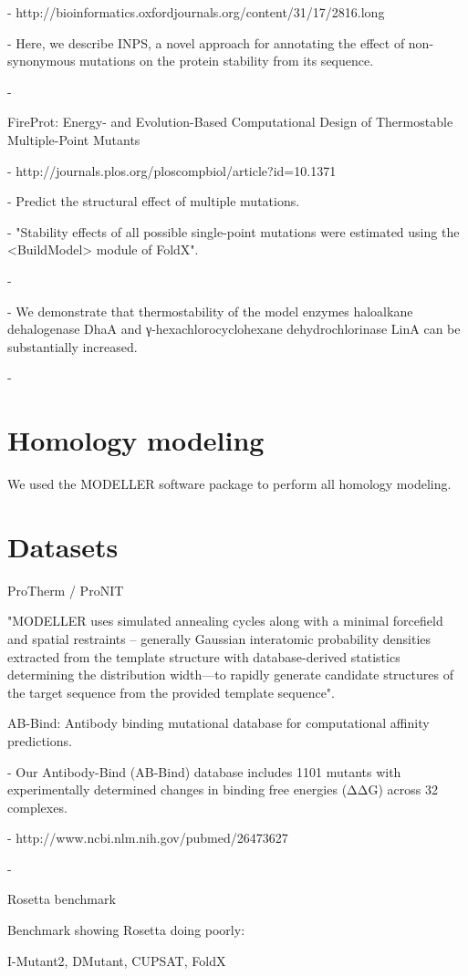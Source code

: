   - http://bioinformatics.oxfordjournals.org/content/31/17/2816.long

  - Here, we describe INPS, a novel approach for annotating the effect of non-synonymous mutations on the protein stability from its sequence.

  - \cite{fariselli_inps:_2015}


FireProt: Energy- and Evolution-Based Computational Design of Thermostable Multiple-Point Mutants

  - http://journals.plos.org/ploscompbiol/article?id=10.1371%

  - Predict the structural effect of multiple mutations.

  - "Stability effects of all possible single-point mutations were estimated using the <BuildModel> module of FoldX".

  -

  - We demonstrate that thermostability of the model enzymes haloalkane dehalogenase DhaA and γ-hexachlorocyclohexane dehydrochlorinase LinA can be substantially increased.

  - \cite{bednar_fireprot:_2015}




\section{Homology modeling}

We used the MODELLER software package to perform all homology modeling.







\section{Datasets}

ProTherm / ProNIT \cite{Zeng2011} \cite{kumar_protherm_2006}

"MODELLER uses simulated annealing cycles along with a minimal forcefield and spatial restraints -- generally Gaussian interatomic probability densities extracted from the template structure with database-derived statistics determining the distribution width—to rapidly generate candidate structures of the target sequence from the provided template sequence".


AB-Bind: Antibody binding mutational database for computational affinity predictions.

  - Our Antibody-Bind (AB-Bind) database includes 1101 mutants with experimentally determined changes in binding free energies (ΔΔG) across 32 complexes.

  - http://www.ncbi.nlm.nih.gov/pubmed/26473627

  - \cite{sirin_ab-bind:_2016}


Rosetta benchmark \cite{o_conchuir_web_2015}

Benchmark showing Rosetta doing poorly: \cite{potapov_assessing_2009}

I-Mutant2, DMutant, CUPSAT, FoldX \cite{khan_performance_2010}
